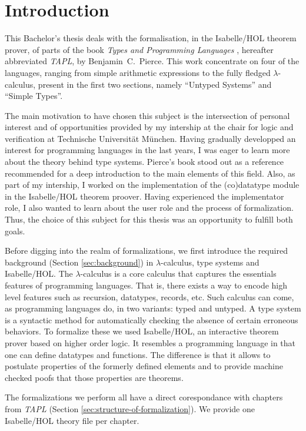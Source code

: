 \section{Introduction}

This Bachelor's thesis deals with the formalisation, in the Isabelle/HOL theorem prover, of parts of
the book \emph{Types and Programming Languages} \cite{pierce-2002-TAPL}, hereafter abbreviated
\emph{TAPL}, by Benjamin~C.~Pierce. This work concentrate on four of the languages, ranging from
simple arithmetic expressions to the fully fledged $\lambda$-calculus, present in the first two
sections, namely ``Untyped Systems'' and ``Simple Types''.

The main motivation to have chosen this subject is the intersection of personal interest and of
opportunities provided by my intership at the chair for logic and verification at Technische
Universität München. Having gradually developped an interest for programming languages in the last
years, I was eager to learn more about the theory behind type systems. Pierce's book stood out as
a reference recommended for a deep introduction to the main elements of this field. Also, as part of
my intership, I worked on the implementation of the (co)datatype module in the Isabelle/HOL
theorem proover. Having experienced the implementator role, I also wanted to learn about the user
role and the process of formalization. Thus, the choice of this subject for this thesis was an
opportunity to fulfill both goals.

Before digging into the realm of formalizations, we first introduce the required background (Section
\ref{sec:background}) in $\lambda$-calculus, type systems and Isabelle/HOL. The $\lambda$-calculus
is a core calculus that captures the essentials features of programming languages. That is, there
exists a way to encode high level features such as recursion, datatypes, records, etc. Such calculus
can come, as programming languages do, in two variants: typed and untyped. A type system is a
syntactic method for automatically checking the absence of certain erroneous behaviors. To formalize
these we used Isabelle/HOL, an interactive theorem prover based on higher order logic. It resembles
a programming language in that one can define datatypes and functions. The difference is that it
allows to postulate properties of the formerly defined elements and to provide machine checked poofs
that those properties are theorems.

The formalizations we perform all have a direct corespondance with chapters from \emph{TAPL}
(Section \ref{sec:structure-of-formalization}). We provide one Isabelle/HOL theory file per chapter.

